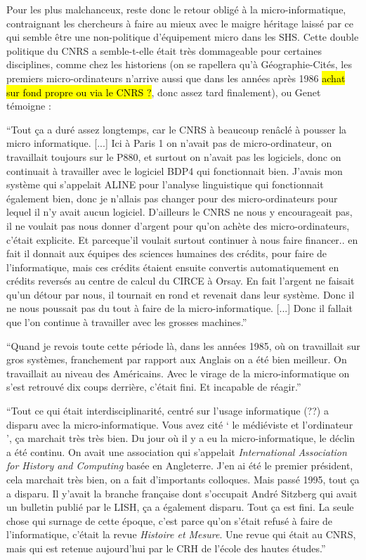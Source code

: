 Pour les plus malchanceux, reste donc le retour obligé à la micro-informatique, contraignant les chercheurs à faire au mieux avec le maigre héritage laissé par ce qui semble être une non-politique d'équipement micro dans les SHS. Cette double politique du CNRS a semble-t-elle était très dommageable pour certaines disciplines, comme chez les historiens (on se rapellera qu'à Géographie-Cités, les premiers micro-ordinateurs n'arrive aussi que dans les années après 1986 \hl{achat sur fond propre ou via le CNRS ?}, donc assez tard finalement), ou Genet témoigne :

\enquote{Tout ça a duré assez longtemps, car le CNRS à beaucoup renâclé à pousser la micro informatique. [...] Ici à Paris 1 on n’avait pas de micro-ordinateur, on travaillait toujours sur le P880, et surtout on n’avait pas les logiciels, donc on continuait à travailler avec le logiciel BDP4 qui fonctionnait bien. J'avais mon système qui s'appelait ALINE pour l'analyse linguistique qui fonctionnait également bien, donc je n'allais pas changer pour des micro-ordinateurs pour lequel il n'y avait aucun logiciel. D'ailleurs le CNRS ne nous y encourageait pas, il ne voulait pas nous donner d'argent pour qu'on achète des micro-ordinateurs, c'était explicite. Et parceque'il voulait surtout continuer à nous faire financer.. en fait il donnait aux équipes des sciences humaines des crédits, pour faire de l'informatique, mais ces crédits étaient ensuite convertis automatiquement en crédits reversés au centre de calcul du CIRCE à Orsay. En fait l'argent ne faisait qu'un détour par nous, il tournait en rond et revenait dans leur système. Donc il ne nous poussait pas du tout à faire de la micro-informatique. [...] Donc il fallait que l'on continue à travailler avec les grosses machines.}

\enquote{Quand je revois toute cette période là, dans les années 1985, où on travaillait sur gros systèmes, franchement par rapport aux Anglais on a été bien meilleur. On travaillait au niveau des Américains. Avec le virage de la micro-informatique on s'est retrouvé dix coups derrière, c'était fini. Et incapable de réagir.}

\enquote{Tout ce qui était interdisciplinarité, centré sur l'usage informatique (??) a disparu avec la micro-informatique. Vous avez cité \enquote{ le médiéviste et l'ordinateur }, ça marchait très très bien. Du jour où il y a eu la micro-informatique, le déclin a été continu. On avait une association qui s'appelait \textit{International Association for History and Computing} basée en Angleterre. J'en ai été le premier président, cela marchait très bien, on a fait d'importants colloques. Mais passé 1995, tout ça a disparu. Il y'avait la branche française dont s'occupait André Sitzberg qui avait un bulletin publié par le LISH, ça a également disparu. Tout ça est fini. La seule chose qui surnage de cette époque, c'est parce qu'on s'était refusé à faire de l'informatique, c'était la revue \textit{Histoire et Mesure}. Une revue qui était au CNRS, mais qui est retenue aujourd'hui par le CRH de l'école des hautes études.}

